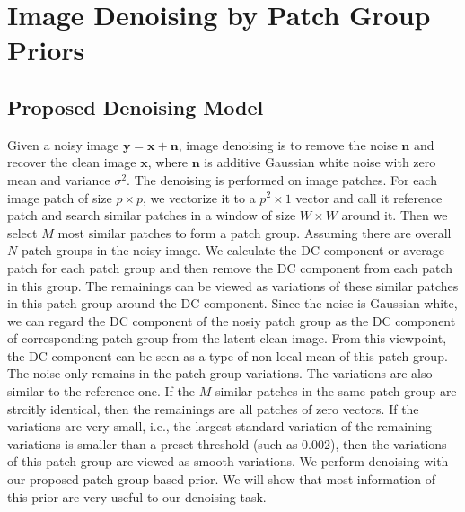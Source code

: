 \documentclass[10pt,twocolumn,letterpaper]{article}
\begin{document}
\section{Image Denoising by Patch Group Priors}
\subsection{Proposed Denoising Model}
Given a noisy image $\mathbf{y} = \mathbf{x} + \mathbf{n}$, image denoising is to remove the noise $\mathbf{n}$ and recover the clean image $\mathbf{x}$, where $\mathbf{n}$ is additive Gaussian white noise with zero mean and variance $\sigma^{2}$. The denoising is performed on image patches. For each image patch of size $p\times p$, we vectorize it to a $p^{2}\times 1$ vector and call it reference patch and search similar patches in a window of size $W\times W$ around it. Then we select $M$ most similar patches to form a patch group. Assuming there are overall $N$ patch groups in the noisy image. We calculate the DC component or average patch for each patch group and then remove the DC component from each patch in this group. The remainings can be viewed as variations of these similar patches in this patch group around the DC component. Since the noise is Gaussian white, we can regard the DC component of the nosiy patch group as the DC component of corresponding patch group from the latent clean image. From this viewpoint, the DC component can be seen as a type of non-local mean of this patch group. The noise only remains in the patch group variations. The variations are also similar to the reference one. If the $M$ similar patches in the same patch group are strcitly identical, then the remainings are all patches of zero vectors. If the variations are very small, i.e., the largest standard variation of the remaining variations is smaller than a preset threshold (such as 0.002), then the variations of this patch group are viewed as smooth variations. We perform denoising with our proposed patch group based prior. We will show that most information of this prior are very useful to our denoising task. 
\end{document}
